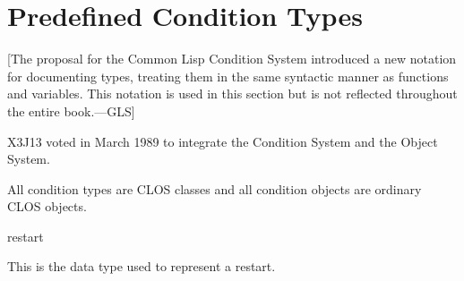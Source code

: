 \section{Predefined Condition Types}        
\label{PREDEFINED-CONDITIONS-SECTION}

[The proposal for the Common Lisp Condition System introduced
a new notation for documenting types, treating them in the
same syntactic manner as functions and variables.  This notation
is used in this section but is not reflected
throughout the entire book.---GLS]

X3J13 voted in March 1989  to integrate
the Condition System and the Object System. 

All condition types
are CLOS classes and all condition objects are ordinary CLOS objects.

\begin{defun}[Type]
restart

This is the data type used to represent a restart.
\end{defun}

